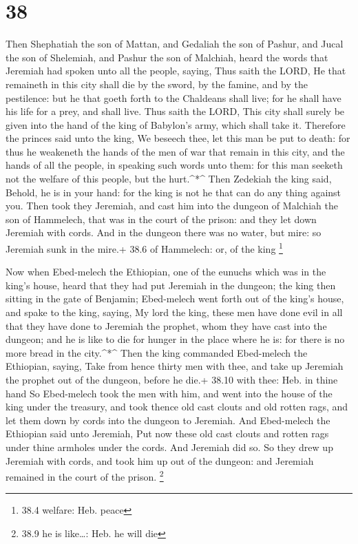 \hypertarget{section-37}{%
\section{38}\label{section-37}}

 Then Shephatiah the son of Mattan, and Gedaliah the son of
Pashur, and Jucal the son of Shelemiah, and Pashur the son of Malchiah,
heard the words that Jeremiah had spoken unto all the people, saying,
 Thus saith the LORD, He that remaineth in this city shall
die by the sword, by the famine, and by the pestilence: but he that
goeth forth to the Chaldeans shall live; for he shall have his life for
a prey, and shall live.  Thus saith the LORD, This city
shall surely be given into the hand of the king of Babylon's army, which
shall take it.  Therefore the princes said unto the king, We
beseech thee, let this man be put to death: for thus he weakeneth the
hands of the men of war that remain in this city, and the hands of all
the people, in speaking such words unto them: for this man seeketh not
the welfare of this people, but the hurt.\^{}*\^{}  Then
Zedekiah the king said, Behold, he is in your hand: for the king is not
he that can do any thing against you.  Then took they
Jeremiah, and cast him into the dungeon of Malchiah the son of
Hammelech, that was in the court of the prison: and they let down
Jeremiah with cords. And in the dungeon there was no water, but mire: so
Jeremiah sunk in the mire.+ 38.6 of Hammelech: or, of the king
\footnote{38.4 welfare: Heb. peace}

 Now when Ebed-melech the Ethiopian, one of the eunuchs
which was in the king's house, heard that they had put Jeremiah in the
dungeon; the king then sitting in the gate of Benjamin; 
Ebed-melech went forth out of the king's house, and spake to the king,
saying,  My lord the king, these men have done evil in all
that they have done to Jeremiah the prophet, whom they have cast into
the dungeon; and he is like to die for hunger in the place where he is:
for there is no more bread in the city.\^{}*\^{}  Then the
king commanded Ebed-melech the Ethiopian, saying, Take from hence thirty
men with thee, and take up Jeremiah the prophet out of the dungeon,
before he die.+ 38.10 with thee: Heb. in thine hand  So
Ebed-melech took the men with him, and went into the house of the king
under the treasury, and took thence old cast clouts and old rotten rags,
and let them down by cords into the dungeon to Jeremiah. 
And Ebed-melech the Ethiopian said unto Jeremiah, Put now these old cast
clouts and rotten rags under thine armholes under the cords. And
Jeremiah did so.  So they drew up Jeremiah with cords, and
took him up out of the dungeon: and Jeremiah remained in the court of
the prison. \footnote{38.9 he is like\ldots: Heb. he will die}

